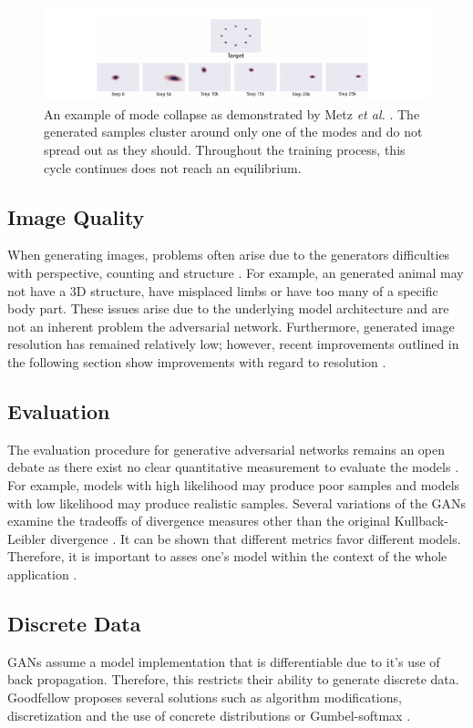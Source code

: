 \documentclass[11pt]{article}
\begin{document}
\begin{figure}
\centering
\includegraphics[scale=0.8]{modecollapse}
\caption{An example of mode collapse as demonstrated by Metz \textit{et al.} \citep{2016arXiv161102163M}. The generated samples cluster around only one of the modes and do not spread out as they should. Throughout the training process, this cycle continues does not reach an equilibrium.}
\label{fig:modecollapse}
\end{figure}

\subsection{Image Quality}
When generating images, problems often arise due to the generators difficulties with perspective, counting and structure \citep{2017arXiv170100160G}. For example, an generated animal may not have a 3D structure, have misplaced limbs or have too many of a specific body part. These issues arise due to the underlying model architecture and are not an inherent problem the adversarial network. Furthermore, generated image resolution has remained relatively low; however, recent improvements outlined in the following section show improvements with regard to resolution \citep{2017arXiv171010196K}.

\subsection{Evaluation}
The evaluation procedure for generative adversarial networks remains an open debate as there exist no clear quantitative measurement to evaluate the models \citep{2017arXiv170100160G}. For example, models with high likelihood may produce poor samples and models with low likelihood may produce realistic samples. Several variations of the GANs examine the tradeoffs of divergence measures other than the original Kullback-Leibler divergence \citep{2015arXiv151101844T}. It can be shown that different metrics favor different models. Therefore, it is important to asses one's model within the context of the whole application \citep{2015arXiv151101844T}.

\subsection{Discrete Data}
GANs assume a model implementation that is differentiable due to it's use of back propagation. Therefore, this restricts their ability to generate discrete data. Goodfellow proposes several solutions such as algorithm modifications, discretization and the use of concrete distributions or Gumbel-softmax \citep{2017arXiv170100160G}.
\end{document}
